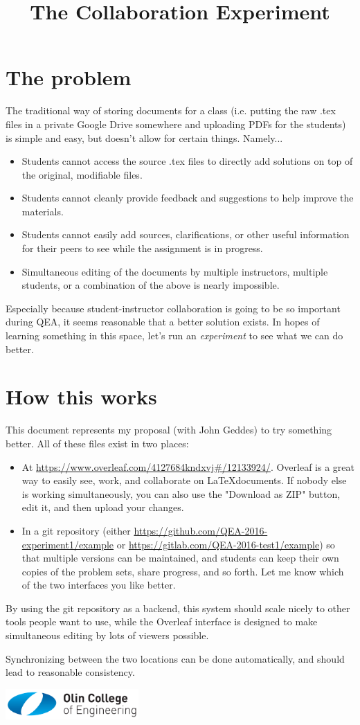 \documentclass{article}
\title{The Collaboration Experiment}
\begin{document}
\maketitle
\large
\section{The problem}
The traditional way of storing documents for a class (i.e. putting the raw .tex files in a private Google Drive somewhere and uploading PDFs for the students) is simple and easy, but doesn't allow for certain things. Namely...
\begin{itemize}
\item Students cannot access the source .tex files to directly add solutions on top of the original, modifiable files.
\item Students cannot cleanly provide feedback and suggestions to help improve the materials.
\item Students cannot easily add sources, clarifications, or other useful information for their peers to see while the assignment is in progress.
\item Simultaneous editing of the documents by multiple instructors, multiple students, or a combination of the above is nearly impossible.
\end{itemize}

Especially because student-instructor collaboration is going to be so important during QEA, it seems reasonable that a better solution exists. In hopes of learning something in this space, let's run an \textit{experiment} to see what we can do better.

\section{How this works}
This document represents my  proposal (with John Geddes) to try something better. All of these files exist in two places:
\begin{itemize}
\item At \url{https://www.overleaf.com/4127684kndxvj#/12133924/}. Overleaf is a great way to easily see, work, and collaborate on \LaTeX documents. If nobody else is working simultaneously, you can also use the "Download as ZIP" button, edit it, and then upload your changes.
\item In a git repository (either \url{https://github.com/QEA-2016-experiment1/example} or \url{https://gitlab.com/QEA-2016-test1/example}) so that multiple versions can be maintained, and students can keep their own copies of the problem sets, share progress, and so forth. Let me know which of the two interfaces you like better.
%
%
\end{itemize}
By using the git repository as a backend, this system should scale nicely to other tools people want to use, while the Overleaf interface is designed to make simultaneous editing by lots of viewers possible.

Synchronizing between the two locations can be done automatically, and should lead to reasonable consistency.

\includegraphics[width=2in]{OlinCollege}
\end{document}
